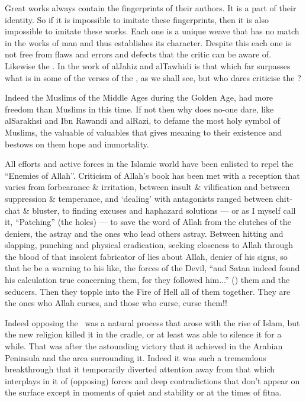 \documentclass[12pt]{memoir}
\begin{document}
Great works always contain the fingerprints of their authors. It is a part of
their identity. So if it is impossible to imitate these fingerprints, then it
is also impossible to imitate these works. Each one is a unique weave that has
no match in the works of man and thus establishes its character. Despite this
each one is not free from flaws and errors and defects that the critic can be
aware of. Likewise the \Quran. In the work of al\–Jahiz and al\–Tawhidi is that
which far surpasses what is in some of the verses of the \Quran, as we shall
see, but who dares criticise the \Quran?

Indeed the Muslims of the Middle Ages during the Golden Age, had more freedom
than Muslims in this time. If not then why does no-one dare, like al\–Sarakhsi
and Ibn Rawandi and al\–Razi, to defame the most holy symbol of Muslims, the
valuable of valuables that gives meaning to their existence and bestows on them
hope and immortality.

All efforts and active forces in the Islamic world have been enlisted to repel
the “Enemies of Allah”. Criticism of Allah’s book has been met with a reception
that varies from forbearance \& irritation, between insult \& vilification and
between suppression \& temperance, and ‘dealing’ with antagonists ranged
between chit-chat \& bluster,
to finding excuses and haphazard solutions — or as
I myself call it, “Patching” (the holes) — to save the word of Allah from the
clutches of the deniers, the astray and the ones who lead others astray.
Between hitting and slapping, punching and physical eradication, seeking
closeness to Allah through the blood of that insolent fabricator of lies about
Allah, denier of his signs, so that he be a warning to his like, the forces of
the Devil, “and Satan indeed found his calculation true concerning them, for
they followed him...” () them and the seducers.
Then they topple into the Fire of Hell all of them together\fnmark.
They are the ones who Allah curses, and those who curse, curse them!!


Indeed opposing the \Quran\ was a natural process that arose with the rise of
Islam, but the new religion killed it in the cradle, or at least was able to
silence it for a while. That was after the astounding victory that it achieved
in the Arabian Peninsula and the area surrounding it. Indeed it was such a
tremendous breakthrough that it temporarily diverted attention away from that
which interplays in it of (opposing) forces and deep contradictions that don’t
appear on the surface except in moments of quiet and stability or at the times
of fitna.
\end{document}
